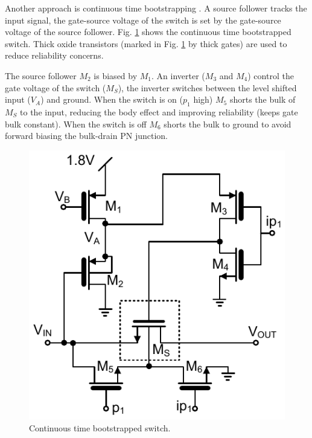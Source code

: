 Another approach is continuous time bootstrapping
\cite{jakonis02}. A source follower tracks the
input signal, the gate-source voltage of the switch is set by
the gate-source voltage of the source follower. Fig. \ref{cbscfig:ctbs}
shows the continuous time bootstrapped switch. Thick
oxide transistors (marked in Fig. \ref{cbscfig:ctbs} by 
thick gates) are used to reduce reliability concerns.

The source follower $M_2$ is biased by $M_1$. An inverter ($M_3$ and
$M_4$) control the gate voltage of the switch ($M_S$), the inverter switches
between the level shifted input ($V_A$) and ground. When the switch is
on ($p_1$ high) $M_5$ shorts the bulk of $M_S$ to the input, reducing the body
effect and improving reliability (keeps gate bulk constant). When the
switch is off $M_6$ shorts the bulk to ground to avoid forward biasing
the bulk-drain PN junction.
\begin{figure}[htbp]
\centerline{ \includegraphics[width=\myfigwidthb]{graphics/ctbs}}
  \caption{Continuous time bootstrapped switch.}
  \label{cbscfig:ctbs}
\end{figure}

